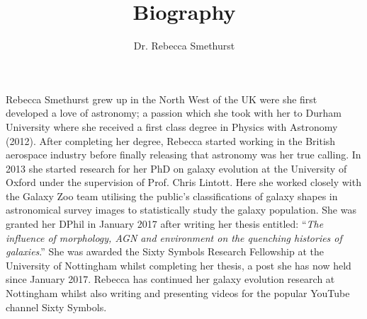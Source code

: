\documentclass{article}
\begin{document}
\title{Biography}
\author{Dr. Rebecca Smethurst}

\maketitle

Rebecca Smethurst grew up in the North West of the UK were she first developed a love of astronomy; a passion which she took with her to Durham University where she received a first class degree in Physics with Astronomy (2012). After completing her degree, Rebecca started working in the British aerospace industry before finally releasing that astronomy was her true calling. In 2013 she started research for her PhD on galaxy evolution at the University of Oxford under the supervision of Prof. Chris Lintott. Here she worked closely with the Galaxy Zoo team utilising the public's classifications of galaxy shapes in astronomical survey images to statistically study the galaxy population. She was granted her DPhil in January 2017 after writing her thesis entitled: ``\emph{The influence of morphology, AGN and environment on the quenching histories of galaxies}.'' She was awarded the Sixty Symbols Research Fellowship at the University of Nottingham whilst completing her thesis, a post she has now held since January 2017. Rebecca has continued her galaxy evolution research at Nottingham whilst also writing and presenting videos for the popular YouTube channel Sixty Symbols. 
\end{document}
